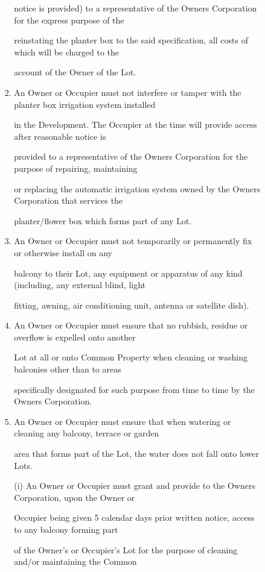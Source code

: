 \documentclass{article}
\begin{document}
\begin{enumerate}[label=\arabic*.]
\begin{enumerate}[label=\arabic{enumi}.\arabic*.]
\begin{enumerate}[label=(\arabic*)]
\begin{enumerate}[label=(\alph*)]
notice is provided) to a representative of the Owners Corporation for the express purpose of the 

reinstating the planter box to the said specification, all costs of which will be charged to the 

account of the Owner of the Lot. 

\item  An Owner or Occupier must not interfere or tamper with the planter box irrigation system installed 

in the Development. The Occupier at the time will provide access after reasonable notice is 

provided to a representative of the Owners Corporation for the purpose of repairing, maintaining 

or replacing the automatic irrigation system owned by the Owners Corporation that services the 

\newpage

planter/flower box which forms part of any Lot. 

\item  An Owner or Occupier must not temporarily or permanently fix or otherwise install on any 

balcony to their Lot, any equipment or apparatus of any kind (including, any external blind, light 

fitting, awning, air conditioning unit, antenna or satellite dish). 

\item  An Owner or Occupier must ensure that no rubbish, residue or overflow is expelled onto another 

Lot at all or onto Common Property when cleaning or washing balconies other than to areas 

specifically designated for such purpose from time to time by the Owners Corporation. 

\item  An Owner or Occupier must ensure that when watering or cleaning any balcony, terrace or garden 

area that forms part of the Lot, the water does not fall onto lower Lots. 

(i) An Owner or Occupier must grant and provide to the Owners Corporation, upon the Owner or 

Occupier being given 5 calendar days prior written notice, access to any balcony forming part 

of the Owner's or Occupier's Lot for the purpose of cleaning and/or maintaining the Common 


\end{enumerate}
\end{enumerate}
\end{enumerate}
\end{enumerate}
\end{document}
